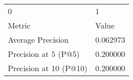 \begin{tabular}{ll}
0 & 1 \\
Metric & Value \\
Average Precision & 0.062973 \\
Precision at 5 (P@5) & 0.200000 \\
Precision at 10 (P@10) & 0.200000 \\
\end{tabular}
